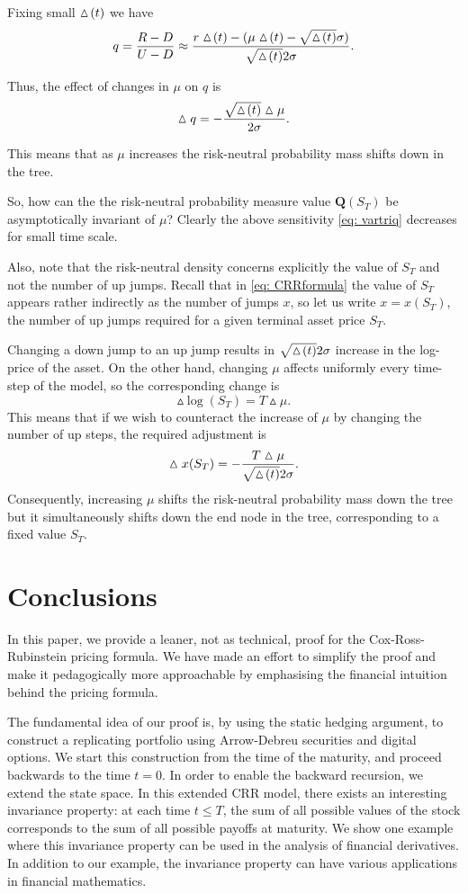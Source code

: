 \documentclass{amsart}
\theoremstyle{definition}
\theoremstyle{remark}
\numberwithin{equation}{section}
\newcommand{\1}{\boldsymbol{1}}
\begin{document}
Fixing small $\ \!\! \vartriangle\! (t)\ \!\!$ we have 
\[q=\frac{R-D}{U-D} \approx \frac{r\t -(\mu\t - \sqrt{\t}\sigma)}{\sqrt{\t}2\sigma}.\]

Thus, the effect of changes in $\mu$ on $q$ is 
\begin{equation}\label{eq: vartriq}
\vartriangle q = - \frac{\sqrt{\ \!\! \vartriangle\! (t)\ \!\!} \vartriangle \mu}{2\sigma}.
\end{equation}

This means that as $\mu$ increases the risk-neutral probability mass shifts down in the tree. 

So, how can the the risk-neutral probability measure value $\mathbf{Q}(S_T)$ be asymptotically invariant of $\mu$?
Clearly the above sensitivity \eqref{eq: vartriq} decreases for small time scale. 

Also, note that the risk-neutral density concerns explicitly the value of $S_T$ and not the number of up jumps. Recall that in \eqref{eq: CRRformula} the value of $S_T$ appears rather indirectly as the number of jumps $x$, so let us write $x=x(S_T)$, the number of up jumps required for a given terminal asset price $S_T$. 

Changing a down jump to an up jump results in $\sqrt{\ \!\! \vartriangle\! (t)\ \!\!} 2 \sigma$ increase in the log-price of the asset.
On the other hand, changing $\mu$ affects uniformly every time-step of the model, so the corresponding change is 
\[\vartriangle \log (S_T) = T \vartriangle \mu .\]
This means that if we wish to counteract the increase of $\mu$ by changing the number of up steps, the required adjustment is
\[\vartriangle x (S_T) =- \frac{T \vartriangle \mu}{\sqrt{\ \!\! \vartriangle\! (t)\ \!\!} 2 \sigma}.\]
Consequently, increasing $\mu$ shifts the risk-neutral probability mass down the tree but it simultaneously shifts down the end node in the tree, corresponding to a fixed value $S_T$.




\section{Conclusions}
In this paper, we provide a leaner, not as technical, proof for the Cox-Ross-Rubinstein pricing formula. We have made an effort to simplify the proof and make it pedagogically more approachable by emphasising the financial intuition behind the pricing formula.

The fundamental idea of our proof is, by using the static hedging argument, to construct a replicating portfolio using Arrow-Debreu securities and digital options. We start this construction from the time of the maturity, and proceed backwards to the time $t=0$. In order to enable the backward recursion, we extend the state space. In this extended CRR model, there exists an interesting invariance property: at each time $t\leq T$, the sum of all possible values of the stock corresponds to the sum of all possible payoffs at maturity.
We show one example where this invariance property can be used in the analysis of financial derivatives. In addition to our example, the invariance property can have various applications in financial mathematics. 
\end{document}
